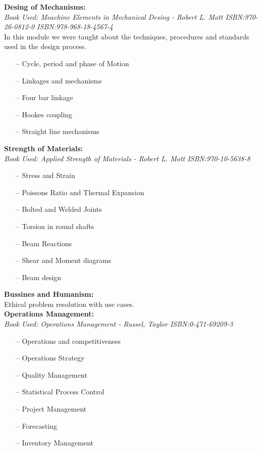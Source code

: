 \documentclass{article}
\begin{document}
\textbf{Desing of Mechanisms:}\\
    \emph{Book Used: Meachine Elements in Mechanical Desing - Robert L. Mott ISBN:970-26-0812-0
    ISBN:978-968-18-4567-4}\\
    In this module we were taught about the techniques, procedures and standards used in
    the design process.
    \begin{itemize}
     \setlength\itemsep{0pt}
        \item[--] Cycle, period and phase of Motion
        \item[--] Linkages and mechanisms
        \item[--] Four bar linkage
        \item[--] Hookes coupling
        \item[--] Straight line mechanisms
    \end{itemize}
 
\textbf{Strength of Materials:}\\
    \emph{Book Used: Applied Strength of Materials - Robert L. Mott ISBN:970-10-5638-8}
    \begin{itemize}
     \setlength\itemsep{0pt}
        \item[--] Stress and Strain
        \item[--] Poissons Ratio and Thermal Expansion
        \item[--] Bolted and Welded Joints
        \item[--] Torsion in round shafts
        \item[--] Beam Reactions
        \item[--] Shear and Moment diagrams
        \item[--] Beam design
    \end{itemize}
 
\textbf{Bussines and Humanism:}\\
    Ethical problem resolution with use cases.\\

\textbf{Operations Management:}\\
    \emph{Book Used: Operations Management - Russel, Taylor    ISBN:0-471-69209-3}
    \begin{itemize}
     \setlength\itemsep{0pt}
      \item[--] Operations and competitiveness
      \item[--] Operations Strategy
      \item[--] Quality Management
      \item[--] Statistical Process Control
      \item[--] Project Management
      \item[--] Forecasting
      \item[--] Inventory Management
    \end{itemize}
\end{document}
